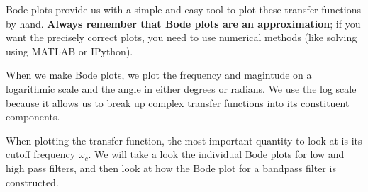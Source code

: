 



Bode plots provide us with a simple and easy tool to plot these transfer functions by hand. \textbf{Always remember that Bode plots are an approximation}; if you want the precisely correct plots, you need to use numerical methods (like solving using MATLAB or IPython).

When we make Bode plots, we plot the frequency and magintude on a logarithmic scale and the angle in either degrees or radians. 
We use the log scale because it allows us to break up complex transfer functions into its constituent components. 


When plotting the transfer function, the most important quantity to look at is its cutoff frequency $\omega_{c}.$ 
We will take a look the individual Bode plots for low and high pass filters, and then look at how the Bode plot for a bandpass filter is constructed. 



